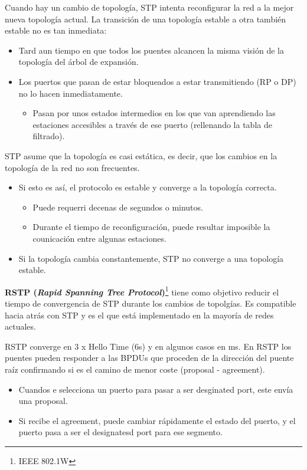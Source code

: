 \documentclass[10pt,portrait, twocolumn]{article}
\begin{document}
Cuando hay un cambio de topología, STP intenta reconfigurar la red a la mejor nueva topología actual. La transición de una topología estable a otra también estable no es tan inmediata:

	\begin{itemize}
	\item Tard aun tiempo en que todos los puentes alcancen la misma visión de la topología del árbol de expansión.
	\item Los puertos que pasan de estar bloqueados a estar transmitiendo (RP o DP) no lo hacen inmediatamente.
		\begin{itemize}
		\item Pasan por unos estados intermedios en los que van aprendiendo las estaciones accesibles a través de ese puerto (rellenando la tabla de filtrado).
		\end{itemize}
	\end{itemize}	
STP asume que la topología es casi estática, es decir, que los cambios en la topología de la red no son frecuentes.
	\begin{itemize}
	\item Si esto es así, el protocolo es estable y converge a la topología correcta.
		\begin{itemize}
		\item Puede requerri decenas de segundos o minutos.
		\item Durante el tiempo de reconfiguración, puede resultar imposible la counicación entre algunas estaciones.
		\end{itemize}
		\item Si la topología cambia constantemente, STP no converge a una topología estable.
	\end{itemize}
	
\textbf{RSTP (\textit{Rapid Spanning Tree Protocol})}\footnote{IEEE 802.1W} tiene como objetivo reducir el tiempo de convergencia de STP durante los cambios de topolgías. Es compatible hacia atrás con STP y es el que está implementado en la mayoría de redes actuales.

	\quad RSTP converge en 3 x Hello Time (6s) y en algunos casos en ms. En RSTP los puentes pueden responder a las BPDUs que proceden de la dirección del puente raíz confirmando si es el camino de menor coste (proposal - agreement).
		\begin{itemize}
		\item Cuandos e selecciona un puerto para pasar a ser desginated port, este envía una proposal.
		\item Si recibe el agreement, puede cambiar rápidamente el estado del puerto, y el puerto pasa a ser el designatesd port para ese segmento.
		\end{itemize}
		
\end{document}
